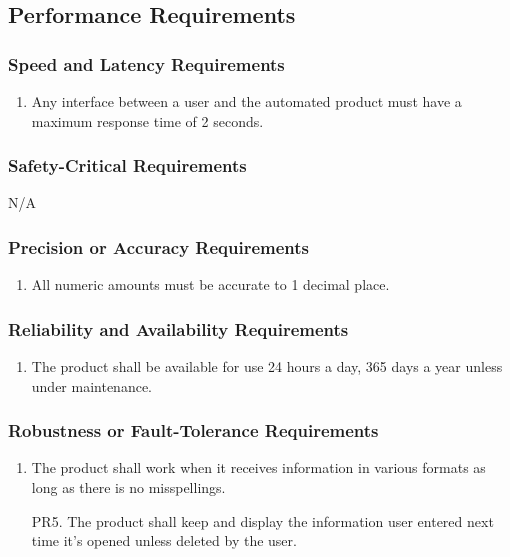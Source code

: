 \documentclass[]{article}
\begin{document}

\subsection{Performance Requirements}
\label{sub:performance_requirements}

\subsubsection{Speed and Latency Requirements}
\label{ssub:speed_and_latency_requirements}
\begin{enumerate}[{PR}1. ]
	\item Any interface between a user and the automated product must have a maximum response time of 2 seconds.
\end{enumerate}

\subsubsection{Safety-Critical Requirements}
\label{ssub:safety_critical_requirements}
N/A

\subsubsection{Precision or Accuracy Requirements}
\label{ssub:precision_or_accuracy_requirements}
\begin{enumerate}[{PR}2. ]
	\item All numeric amounts must be accurate to 1 decimal place.
\end{enumerate}

\subsubsection{Reliability and Availability Requirements}
\label{ssub:reliability_and_availability_requirements}
\begin{enumerate}[{PR}3. ]
	\item The product shall be available for use 24 hours a day, 365 days a year unless under maintenance.
\end{enumerate}

\subsubsection{Robustness or Fault-Tolerance Requirements}
\label{ssub:robustness_or_fault_tolerance_requirements}
\begin{enumerate}[{PR}4. ]
	\item The product shall work when it receives information in various formats as long as there is no misspellings.
	\item[{PR}5. ] The product shall keep and display the information user entered next time it's opened unless deleted by the user.
\end{enumerate}
\end{document}
